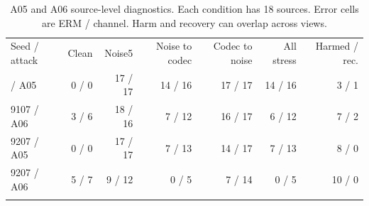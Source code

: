 \begin{table}[t]
\caption{A05 and A06 source-level diagnostics. Each condition has 18 sources. Error cells are ERM / channel. Harm and recovery can overlap across views.}\label{tab:attackconditions}
\centering
\small
\begin{tabular}{@{}lrrrrrr@{}}
\toprule
Seed / attack & Clean & Noise5 & Noise to codec & Codec to noise & All stress & Harmed / rec. \\
\colrule
9107 / A05 & 0 / 0 & 17 / 17 & 14 / 16 & 17 / 17 & 14 / 16 & 3 / 1 \\
9107 / A06 & 3 / 6 & 18 / 16 & 7 / 12 & 16 / 17 & 6 / 12 & 7 / 2 \\
9207 / A05 & 0 / 0 & 17 / 17 & 7 / 13 & 14 / 17 & 7 / 13 & 8 / 0 \\
9207 / A06 & 5 / 7 & 9 / 12 & 0 / 5 & 7 / 14 & 0 / 5 & 10 / 0 \\
\botrule
\end{tabular}
\end{table}
